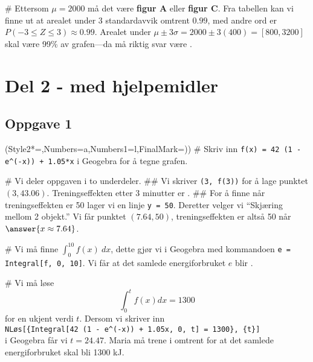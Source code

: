 \begin{easylist}[enumerate]
	# Ettersom $\mu = 2000$ må det være \textbf{figur A} eller \textbf{figur C}.
	Fra tabellen kan vi finne ut at arealet under 3 standardavvik omtrent $0.99$,
	med andre ord er $P(-3 \leq Z \leq 3) \approx 0.99$.
	Arealet under $\mu \pm 3 \sigma = 2000 \pm 3(400) = \left[800, 3200\right]$
	skal være 99\% av grafen---da må riktig svar være .

\end{easylist}
	
	
	
	
	
\section*{Del 2 - med hjelpemidler}
\subsection*{Oppgave 1}
\begin{easylist}[enumerate]
	\ListProperties(Style2*=,Numbers=a,Numbers1=l,FinalMark={)})
	# Skriv inn \texttt{f(x) = 42 (1 - e\textasciicircum(-x)) + 1.05*x} i Geogebra for å tegne grafen.
	
	# Vi deler oppgaven i to underdeler.
	## Vi skriver \texttt{(3, f(3))} for å lage punktet $(3,43.06)$. Treningseffekten etter 3 minutter er 
	. 
	## For å finne når treningseffekten er 50 lager vi en linje \texttt{y = 50}.
	Deretter velger vi ``Skjæring mellom 2 objekt.'' Vi får punktet $(7.64, 50)$,
	treningseffekten er altså 50 når $\answer{x \approx 7.64}$.
	
	# Vi må finne $\int_{0}^{10} f(x) \ dx$, dette gjør vi i Geogebra med kommandoen
	\texttt{e = Integral[f, 0, 10]}. Vi får at det samlede energiforbruket $e$ blir .
	
	# Vi må løse
	\begin{equation*}
		\int_{0}^{t} f(x) dx = 1300
	\end{equation*}
	for en ukjent verdi $t$. Dersom vi skriver inn \\
	\texttt{NLøs[\{Integral[42 (1 - e\textasciicircum(-x)) + 1.05x, 0, t] = 1300\}, \{t\}]} \\
	i Geogebra får vi $t = 24.47$. Maria må trene i omtrent  for at det samlede energiforbruket skal bli 1300 kJ.
\end{easylist}


